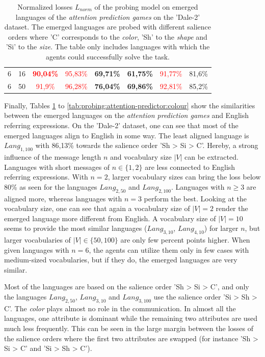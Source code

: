\begin{table}[ht]
\begin{tabular}{cc|c|c|c|c|c|c}
        {6} & {16}  & \textcolor{red}{\textbf{90,04\%}} & \textcolor{red}{95,83\%}          & \textbf{69,71\%}         & \textbf{61,75\%}         & \textcolor{red}{91,77\%} & {81,6\%}                 \\
        {6} & {50}  & \textcolor{red}{91,9\%}           & \textcolor{red}{96,28\%}          & \textbf{76,04\%}         & \textbf{69,86\%}         & \textcolor{red}{92,81\%} & {85,2\%}                 \\
        \bottomrule
    \end{tabular}
    \caption{Normalized losses $L_{norm}$ of the probing model on emerged languages of the \emph{attention prediction games} on the 'Dale-2' dataset. The emerged languages are probed with different salience orders where 'C' corresponds to the \emph{color}, 'Sh' to the \emph{shape} and 'Si' to the \emph{size}. The table only includes languages with which the agents could successfully solve the task.}
    \label{tab:probing:attention-predictor:dale-2}
\end{table}

Finally, Tables \ref{tab:probing:attention-predictor:dale-2} to \ref{tab:probing:attention-predictor:colour} show the similarities between the emerged languages on the \emph{attention prediction games} and English referring expressions.
On the 'Dale-2' dataset, one can see that most of the emerged languages align to English in some way.
The least aligned language is $Lang_{1,100}$ with 86,13\% towards the salience order 'Sh > Si > C'.
Hereby, a strong influence of the message length $n$ and vocabulary size $|V|$ can be extracted.
Languages with short messages of $n \in \{1,2\}$ are less connected to English referring expressions.
With $n=2$, larger vocabulary sizes can bring the loss below 80\% as seen for the languages $Lang_{2,50}$ and $Lang_{2,100}$.
Languages with $n \geq 3$ are aligned more, whereas languages with $n=3$ perform the best.
Looking at the vocabulary size, one can see that again a vocabulary size of $|V|=2$ render the emerged language more different from English.
A vocabulary size of $|V|=10$ seems to provide the most similar languages ($Lang_{3,10}$, $Lang_{4,10}$) for larger $n$, but larger vocabularies of $|V| \in \{50,100\}$ are only few percent points higher.
When given languages with $n=6$, the agents can utilize them only in few cases with medium-sized vocabularies, but if they do, the emerged languages are very similar.

Most of the languages are based on the salience order 'Sh > Si > C', and only the languages $Lang_{2,50}$, $Lang_{3,10}$ and $Lang_{3,100}$ use the salience order 'Si > Sh > C'.
The \emph{color} plays almost no role in the communication.
In almost all the languages, one attribute is dominant while the remaining two attributes are used much less frequently.
This can be seen in the large margin between the losses of the salience orders where the first two attributes are swapped (for instance 'Sh > Si > C' and 'Si > Sh > C').

